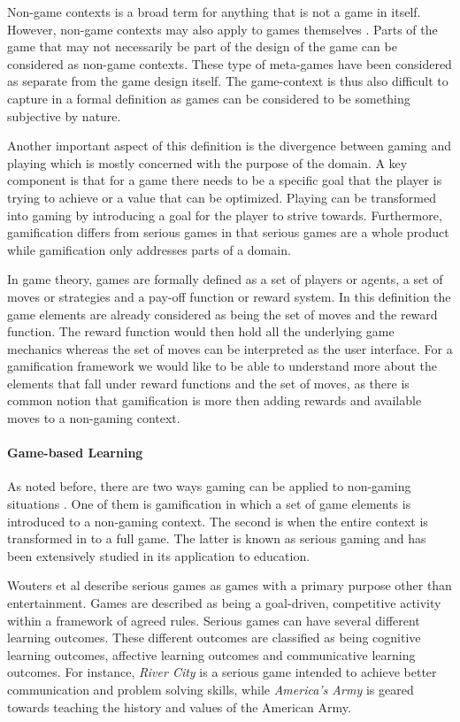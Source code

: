 \documentclass[11pt]{article}
\begin{document}
Non-game contexts is a broad term for anything that is not a game in itself. However, non-game contexts may also apply to games themselves \cite{Deterding2011}. Parts of the game that may not necessarily be part of the design of the game can be considered as non-game contexts. These type of meta-games have been considered as separate from the game design itself. The game-context is thus also difficult to capture in a formal definition as games can be considered to be something subjective by nature. 

Another important aspect of this definition is the divergence between gaming and playing \cite{Groh2012} which is mostly concerned with the purpose of the domain. A key component is that for a game there needs to be a specific goal that the player is trying to achieve or a value that can be optimized. Playing can be transformed into gaming by introducing a goal for the player to strive towards. Furthermore, gamification differs from serious games in that serious games are a whole product while gamification only addresses parts of a domain.

In game theory, games are formally defined as a set of players or agents, a set of moves or strategies and a pay-off function or reward system. In this definition the game elements are already considered as being the set of moves and the reward function. The reward function would then hold all the underlying game mechanics whereas the set of moves can be interpreted as the user interface. For a gamification framework we would like to be able to understand more about the elements that fall under reward functions and the set of moves, as there is common notion that gamification is more then adding rewards and available moves to a non-gaming context.



\paragraph{Game-based Learning}
As noted before, there are two ways gaming can be applied to non-gaming situations \cite{Groh2012, Gros2007}. One of them is gamification in which a set of game elements is introduced to a non-gaming context. The second is when the entire context is transformed in to a full game. The latter is known as serious gaming and has been extensively studied \cite{Wouters2009} in its application to education.

Wouters et al describe serious games as games with a primary purpose other than entertainment. Games are described as being a goal-driven, competitive activity within a framework of agreed rules. Serious games can have several different learning outcomes. These different outcomes are classified as being cognitive learning outcomes, affective learning outcomes and communicative learning outcomes. For instance, \emph{River City} is a serious game intended to achieve better communication and problem solving skills, while \emph{America's Army} is geared towards teaching the history and values of the American Army. 
\end{document}
